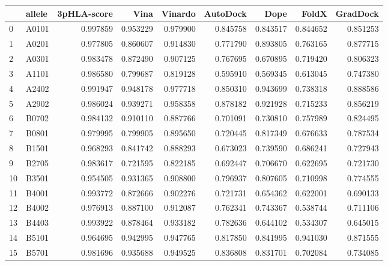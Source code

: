 \begin{tabular}{llrrrrrrr}
\toprule
{} & allele &  3pHLA-score &      Vina &   Vinardo &  AutoDock &      Dope &     FoldX &  GradDock \\
\midrule
0  &  A0101 &     0.997859 &  0.953229 &  0.979900 &  0.845758 &  0.843517 &  0.844652 &  0.851253 \\
1  &  A0201 &     0.977805 &  0.860607 &  0.914830 &  0.771790 &  0.893805 &  0.763165 &  0.877715 \\
2  &  A0301 &     0.983478 &  0.872490 &  0.907125 &  0.767695 &  0.670895 &  0.719420 &  0.806323 \\
3  &  A1101 &     0.986580 &  0.799687 &  0.819128 &  0.595910 &  0.569345 &  0.613045 &  0.747380 \\
4  &  A2402 &     0.991947 &  0.948178 &  0.977718 &  0.850310 &  0.943699 &  0.738318 &  0.888586 \\
5  &  A2902 &     0.986024 &  0.939271 &  0.958358 &  0.878182 &  0.921928 &  0.715233 &  0.856219 \\
6  &  B0702 &     0.984132 &  0.910110 &  0.887766 &  0.701091 &  0.730810 &  0.757989 &  0.824495 \\
7  &  B0801 &     0.979995 &  0.799905 &  0.895650 &  0.720445 &  0.817349 &  0.676633 &  0.787534 \\
8  &  B1501 &     0.968293 &  0.841742 &  0.888293 &  0.673023 &  0.739590 &  0.686241 &  0.727943 \\
9  &  B2705 &     0.983617 &  0.721595 &  0.822185 &  0.692447 &  0.706670 &  0.622695 &  0.721730 \\
10 &  B3501 &     0.954505 &  0.931365 &  0.908800 &  0.796937 &  0.807605 &  0.710998 &  0.774555 \\
11 &  B4001 &     0.993772 &  0.872666 &  0.902276 &  0.721731 &  0.654362 &  0.622001 &  0.690133 \\
12 &  B4002 &     0.976913 &  0.887100 &  0.912087 &  0.762341 &  0.743367 &  0.538744 &  0.711106 \\
13 &  B4403 &     0.993922 &  0.878464 &  0.933182 &  0.782636 &  0.644102 &  0.534307 &  0.645015 \\
14 &  B5101 &     0.964695 &  0.942995 &  0.947765 &  0.817850 &  0.841995 &  0.941030 &  0.871555 \\
15 &  B5701 &     0.981696 &  0.935688 &  0.949525 &  0.836808 &  0.831701 &  0.702084 &  0.734085 \\
\bottomrule
\end{tabular}
